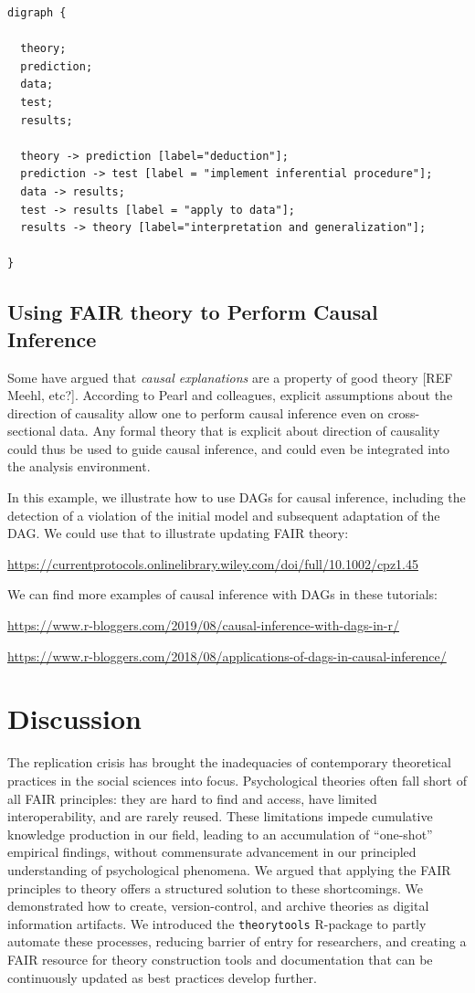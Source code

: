 \documentclass[
  man,floatsintext]{apa6}
\begin{document}
\begin{verbatim}
digraph {

  theory;
  prediction;
  data;
  test;
  results;
  
  theory -> prediction [label="deduction"];
  prediction -> test [label = "implement inferential procedure"];
  data -> results;
  test -> results [label = "apply to data"];
  results -> theory [label="interpretation and generalization"];

}
\end{verbatim}

\subsection{Using FAIR theory to Perform Causal Inference}\label{using-fair-theory-to-perform-causal-inference}

Some have argued that \emph{causal explanations} are a property of good theory {[}REF Meehl, etc?{]}.
According to Pearl and colleagues,
explicit assumptions about the direction of causality allow one to perform causal inference even on cross-sectional data.
Any formal theory that is explicit about direction of causality could thus be used to guide causal inference,
and could even be integrated into the analysis environment.

In this example, we illustrate how to use DAGs for causal inference, including the detection of a violation of the initial model and subsequent adaptation of the DAG. We could use that to illustrate updating FAIR theory:

\url{https://currentprotocols.onlinelibrary.wiley.com/doi/full/10.1002/cpz1.45}

We can find more examples of causal inference with DAGs in these tutorials:

\url{https://www.r-bloggers.com/2019/08/causal-inference-with-dags-in-r/}

\url{https://www.r-bloggers.com/2018/08/applications-of-dags-in-causal-inference/}

\section{Discussion}\label{discussion}

The replication crisis has brought the inadequacies of contemporary theoretical practices in the social sciences into focus.
Psychological theories often fall short of all FAIR principles: they are hard to find and access, have limited interoperability, and are rarely reused.
These limitations impede cumulative knowledge production in our field,
leading to an accumulation of ``one-shot'' empirical findings, without commensurate advancement in our principled understanding of psychological phenomena.
We argued that applying the FAIR principles to theory offers a structured solution to these shortcomings.
We demonstrated how to create, version-control, and archive theories as digital information artifacts.
We introduced the \texttt{theorytools} R-package to partly automate these processes, reducing barrier of entry for researchers,
and creating a FAIR resource for theory construction tools and documentation that can be continuously updated as best practices develop further.
\end{document}
